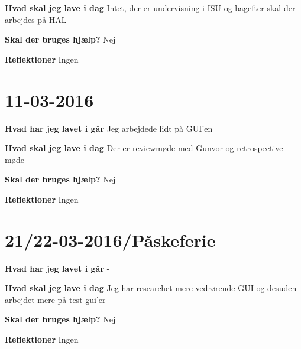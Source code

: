 \documentclass{article}
\begin{document}
	\textbf{Hvad skal jeg lave i dag} Intet, der er undervisning i ISU og bagefter skal der arbejdes på HAL
	
	\textbf{Skal der bruges hjælp?} Nej
	
	\textbf{Reflektioner} Ingen
	
	\section{11-03-2016}
	
	\textbf{Hvad har jeg lavet i går} Jeg arbejdede lidt på GUI'en
	
	\textbf{Hvad skal jeg lave i dag} Der er reviewmøde med Gunvor og retrospective møde
	
	\textbf{Skal der bruges hjælp?} Nej
	
	\textbf{Reflektioner} Ingen
	
	\section{21/22-03-2016/Påskeferie}
	
	\textbf{Hvad har jeg lavet i går} -
	
	\textbf{Hvad skal jeg lave i dag} Jeg har researchet mere vedrørende GUI og desuden arbejdet mere på test-gui'er
	
	\textbf{Skal der bruges hjælp?} Nej
	
	\textbf{Reflektioner} Ingen
		
\end{document}
